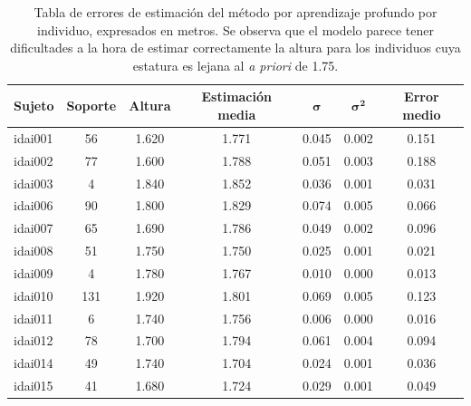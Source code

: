 \begin{table}[ht]
  \scriptsize
  \centering
\begin{tabular}{|l|c|c|c|c|c|c|}
\hline
\rowcolor[HTML]{FFCB2F}
\textbf{Sujeto}&\textbf{ Soporte }&\textbf{ Altura }&\textbf{ Estimación media }&$\bm{\sigma}$&$\bm{\sigma^2}$ &\textbf{ Error medio }\\
\hline
idai001 & 56 & 1.620 & 1.771 & 0.045 & 0.002 & 0.151 \\
\hline
idai002 & 77 & 1.600 & 1.788 & 0.051 & 0.003 & 0.188 \\
\hline
idai003 & 4 & 1.840 & 1.852 & 0.036 & 0.001 & 0.031 \\
\hline
idai006 & 90 & 1.800 & 1.829 & 0.074 & 0.005 & 0.066 \\
\hline
idai007 & 65 & 1.690 & 1.786 & 0.049 & 0.002 & 0.096 \\
\hline
idai008 & 51 & 1.750 & 1.750 & 0.025 & 0.001 & 0.021 \\
\hline
idai009 & 4 & 1.780 & 1.767 & 0.010 & 0.000 & 0.013 \\
\hline
idai010 & 131 & 1.920 & 1.801 & 0.069 & 0.005 & 0.123 \\
\hline
idai011 & 6 & 1.740 & 1.756 & 0.006 & 0.000 & 0.016 \\
\hline
idai012 & 78 & 1.700 & 1.794 & 0.061 & 0.004 & 0.094 \\
\hline
idai014 & 49 & 1.740 & 1.704 & 0.024 & 0.001 & 0.036 \\
\hline
idai015 & 41 & 1.680 & 1.724 & 0.029 & 0.001 & 0.049 \\
\hline
\end{tabular}
\caption[Tabla de errores de estimación del método por aprendizaje profundo por individuo, expresados en metros.]{
Tabla de errores de estimación del método por aprendizaje profundo por individuo, expresados en metros.
Se observa que el modelo parece tener dificultades a la hora de estimar correctamente la altura para los individuos
cuya estatura es lejana al \emph{a priori} de 1.75.
}\label{tab:ResultsBySubject}
\end{table}

